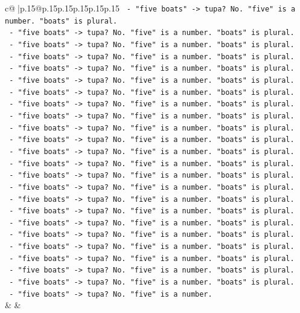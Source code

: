 \documentclass{article}
\begin{document}
{\begin{supertabular}{c@{$\;$}|p{.15\linewidth}@{}p{.15\linewidth}p{.15\linewidth}p{.15\linewidth}p{.15\linewidth}p{.15\linewidth}}
{{{\texttt{   {-} "five boats" {-}> tupa? No. "five" is a number. "boats" is plural.} \\
\texttt{   {-} "five boats" {-}> tupa? No. "five" is a number. "boats" is plural.} \\
\texttt{   {-} "five boats" {-}> tupa? No. "five" is a number. "boats" is plural.} \\
\texttt{   {-} "five boats" {-}> tupa? No. "five" is a number. "boats" is plural.} \\
\texttt{   {-} "five boats" {-}> tupa? No. "five" is a number. "boats" is plural.} \\
\texttt{   {-} "five boats" {-}> tupa? No. "five" is a number. "boats" is plural.} \\
\texttt{   {-} "five boats" {-}> tupa? No. "five" is a number. "boats" is plural.} \\
\texttt{   {-} "five boats" {-}> tupa? No. "five" is a number. "boats" is plural.} \\
\texttt{   {-} "five boats" {-}> tupa? No. "five" is a number. "boats" is plural.} \\
\texttt{   {-} "five boats" {-}> tupa? No. "five" is a number. "boats" is plural.} \\
\texttt{   {-} "five boats" {-}> tupa? No. "five" is a number. "boats" is plural.} \\
\texttt{   {-} "five boats" {-}> tupa? No. "five" is a number. "boats" is plural.} \\
\texttt{   {-} "five boats" {-}> tupa? No. "five" is a number. "boats" is plural.} \\
\texttt{   {-} "five boats" {-}> tupa? No. "five" is a number. "boats" is plural.} \\
\texttt{   {-} "five boats" {-}> tupa? No. "five" is a number. "boats" is plural.} \\
\texttt{   {-} "five boats" {-}> tupa? No. "five" is a number. "boats" is plural.} \\
\texttt{   {-} "five boats" {-}> tupa? No. "five" is a number. "boats" is plural.} \\
\texttt{   {-} "five boats" {-}> tupa? No. "five" is a number. "boats" is plural.} \\
\texttt{   {-} "five boats" {-}> tupa? No. "five" is a number. "boats" is plural.} \\
\texttt{   {-} "five boats" {-}> tupa? No. "five" is a number. "boats" is plural.} \\
\texttt{   {-} "five boats" {-}> tupa? No. "five" is a number. "boats" is plural.} \\
\texttt{   {-} "five boats" {-}> tupa? No. "five" is a number. "boats" is plural.} \\
\texttt{   {-} "five boats" {-}> tupa? No. "five" is a number. "boats" is plural.} \\
\texttt{   {-} "five boats" {-}> tupa? No. "five" is a number.} \\
            }
        }
    }
    & & \\ \\


\end{supertabular}}
\end{document}
